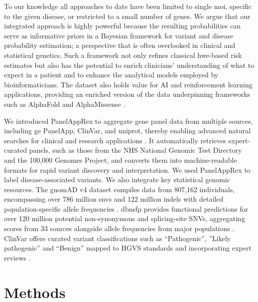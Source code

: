 To our knowledge all approaches to date have been limited to single \ac{moi}, specific to the given disease, or restricted to a small number of genes.
We argue that our integrated approach is highly powerful because the resulting probabilities can serve as informative priors in a Bayesian framework for variant and disease probability estimation; a perspective that is often overlooked in clinical and statistical genetics. Such a framework not only refines classical \ac{hwe}-based risk estimates but also has the potential to enrich clinicians’ understanding of what to expect in a patient and to enhance the analytical models employed by bioinformaticians.
The dataset also holds value for AI and reinforcement learning applications, providing an enriched version of the data underpinning frameworks such as AlphaFold \cite{jumper_highly_2021} and AlphaMissense \cite{cheng_accurate_2023}.

We introduced PanelAppRex to aggregate gene panel data from multiple sources, including \ac{ge} PanelApp, ClinVar, and \ac{uniprot}, thereby enabling advanced natural searches for clinical and research applications \cite{lawless_panelapprex_2025, martin_panelapp_2019, landrum_clinvar_2018, the_uniprot_consortium_uniprot_2025}. It automatically retrieves expert-curated panels, such as those from the NHS National Genomic Test Directory and the 100,000 Genomes Project, and converts them into machine-readable formats for rapid variant discovery and interpretation. We used PanelAppRex to label disease-associated variants.
We also integrate key statistical genomic resources. The gnomAD v4 dataset compiles data from 807,162 individuals, encompassing over 786 million \ac{snv}s and 122 million \ac{indel}s with detailed population-specific allele frequencies \cite{karczewski2020mutational}. \ac{dbnsfp} provides functional predictions for over 120 million potential non-synonymous and splicing-site SNVs, aggregating scores from 33 sources alongside allele frequencies from major populations \cite{liu_dbnsfp_2020}. ClinVar offers curated variant classifications such as ``Pathogenic'', ''Likely pathogenic'' and ``Benign'' mapped to HGVS standards and incorporating expert reviews \cite{landrum_clinvar_2018}.


\section{Methods}
